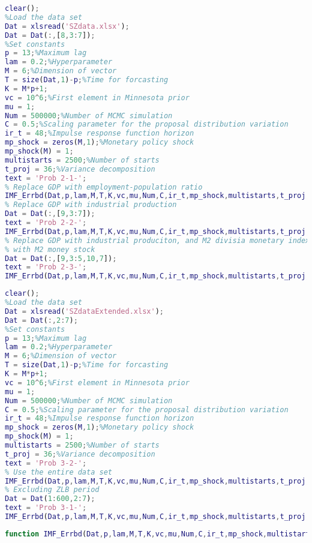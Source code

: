 \documentclass[11pt, oneside]{article}   	%
\begin{document}
\begin{appendices}
\begin{lstlisting}[language=Matlab ,caption={\textit{prob2.m}}, label={code:prob2}]
clear();
%Load the data set
Dat = xlsread('SZdata.xlsx');
Dat = Dat(:,[8,3:7]);
%Set constants
p = 13;%Maximum lag
lam = 0.2;%Hyperparameter
M = 6;%Dimension of vector
T = size(Dat,1)-p;%Time for forcasting
K = M*p+1;
vc = 10^6;%First element in Minnesota prior
mu = 1;
Num = 500000;%Number of MCMC simulation
C = 0.5;%Scaling parameter for the proposal distribution variation
ir_t = 48;%Impulse response function horizon
mp_shock = zeros(M,1);%Monetary policy shock
mp_shock(M) = 1;
multistarts = 2500;%Number of starts
t_proj = 36;%Variance decomposition
text = 'Prob 2-1-';
% Replace GDP with employment-population ratio
IMF_Errbd(Dat,p,lam,M,T,K,vc,mu,Num,C,ir_t,mp_shock,multistarts,t_proj,text);
% Replace GDP with industrial production
Dat = Dat(:,[9,3:7]);
text = 'Prob 2-2-';
IMF_Errbd(Dat,p,lam,M,T,K,vc,mu,Num,C,ir_t,mp_shock,multistarts,t_proj,text);
% Replace GDP with industrial produciton, and M2 divisia monetary index
% with M2 money stock
Dat = Dat(:,[9,3:5,10,7]);
text = 'Prob 2-3-';
IMF_Errbd(Dat,p,lam,M,T,K,vc,mu,Num,C,ir_t,mp_shock,multistarts,t_proj,text);
\end{lstlisting}

\begin{lstlisting}[language=Matlab ,caption={\textit{prob3.m}}, label={code:prob3}]
clear();
%Load the data set
Dat = xlsread('SZdataExtended.xlsx');
Dat = Dat(:,2:7);
%Set constants
p = 13;%Maximum lag
lam = 0.2;%Hyperparameter
M = 6;%Dimension of vector
T = size(Dat,1)-p;%Time for forcasting
K = M*p+1;
vc = 10^6;%First element in Minnesota prior
mu = 1;
Num = 500000;%Number of MCMC simulation
C = 0.5;%Scaling parameter for the proposal distribution variation
ir_t = 48;%Impulse response function horizon
mp_shock = zeros(M,1);%Monetary policy shock
mp_shock(M) = 1;
multistarts = 2500;%Number of starts
t_proj = 36;%Variance decomposition
text = 'Prob 3-2-';
% Use the entire data set
IMF_Errbd(Dat,p,lam,M,T,K,vc,mu,Num,C,ir_t,mp_shock,multistarts,t_proj,text);
% Excluding ZLB period
Dat = Dat(1:600,2:7);
text = 'Prob 3-1-';
IMF_Errbd(Dat,p,lam,M,T,K,vc,mu,Num,C,ir_t,mp_shock,multistarts,t_proj,text);
\end{lstlisting}

\begin{lstlisting}[language=Matlab ,caption={\textit{IMF\textunderscore Errbd.m} function calculates the mode of posteriors for $A_0$ and $B$. Then, use them calculate impulse response functions with error bands by empirical quantile from MCMC simulation.}, label={code:IMF_Errbd}]
function IMF_Errbd(Dat,p,lam,M,T,K,vc,mu,Num,C,ir_t,mp_shock,multistarts,t_proj,text)


\end{lstlisting}
\end{appendices}
\end{document}
